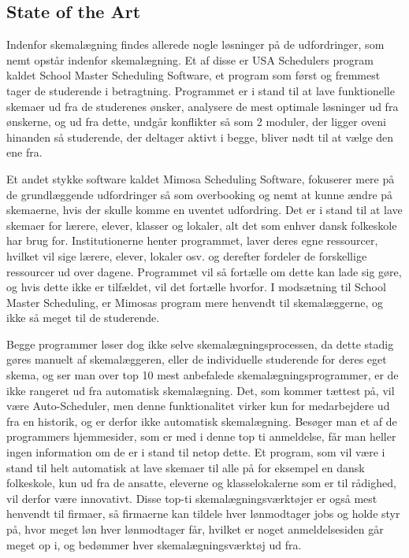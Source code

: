\subsection{State of the Art}
Indenfor skemalægning findes allerede nogle løsninger på de udfordringer, som nemt opstår indenfor skemalægning. Et af disse er USA Schedulers program kaldet School Master Scheduling Software\cite{USAS}, et program som først og fremmest tager de studerende i betragtning. Programmet er i stand til at lave funktionelle skemaer ud fra de studerenes ønsker, analysere de mest optimale løsninger ud fra ønskerne, og ud fra dette, undgår konflikter så som 2 moduler, der ligger oveni hinanden så studerende, der deltager aktivt i begge, bliver nødt til at vælge den ene fra.

Et andet stykke software kaldet Mimosa Scheduling Software\cite{Mimosa}, fokuserer mere på de grundlæggende udfordringer så som overbooking og nemt at kunne ændre på skemaerne, hvis der skulle komme en uventet udfordring. Det er i stand til at lave skemaer for lærere, elever, klasser og lokaler, alt det som enhver dansk folkeskole har brug for. Institutionerne henter programmet, laver deres egne ressourcer, hvilket vil sige lærere, elever, lokaler osv. og derefter fordeler de forskellige ressourcer ud over dagene. Programmet vil så fortælle om dette kan lade sig gøre, og hvis dette ikke er tilfældet, vil det fortælle hvorfor\cite{MimosaTutorial}. I modsætning til School Master Scheduling, er Mimosas program mere henvendt til skemalæggerne, og ikke så meget til de studerende. 

Begge programmer løser dog ikke selve skemalægningsprocessen, da dette stadig gøres manuelt af skemalæggeren, eller de individuelle studerende for deres eget skema, og ser man over top 10 mest anbefalede skemalægningsprogrammer\cite{top10Schedulers}, er de ikke rangeret ud fra automatisk skemalægning. Det, som kommer tættest på, vil være Auto-Scheduler, men denne funktionalitet virker kun for medarbejdere ud fra en historik, og er derfor ikke automatisk skemalægning. Besøger man et af de programmers hjemmesider, som er med i denne top ti anmeldelse, får man heller ingen information om de er i stand til netop dette. Et program, som vil være i stand til helt automatisk at lave skemaer til alle på for eksempel en dansk folkeskole, kun ud fra de ansatte, eleverne og klasselokalerne som er til rådighed, vil derfor være innovativt. Disse top-ti skemalægningsværktøjer er også mest henvendt til firmaer, så firmaerne kan tildele hver lønmodtager jobs og holde styr på, hvor meget løn hver lønmodtager får, hvilket er noget anmeldelsesiden går meget op i, og bedømmer hver skemalægningsværktøj ud fra.

